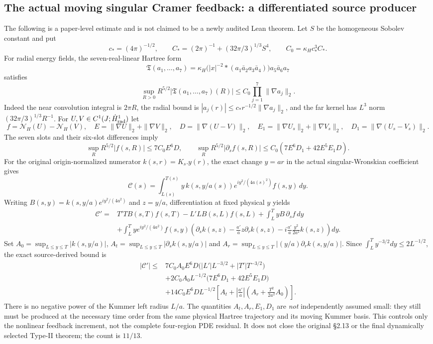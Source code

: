 \subsection*{The actual moving singular Cramer feedback: a differentiated source producer}
The following is a paper-level estimate and is not claimed to be a newly audited Lean theorem.
Let $S$ be the homogeneous Sobolev constant and put
\[
c_*=(4\pi)^{-1/2},\qquad
C_*=(2\pi)^{-1}+(32\pi/3)^{1/3}S^4,\qquad
C_0=\kappa_Hc_*^3C_*.
\]
For radial energy fields, the seven-real-linear Hartree form
\[
\mathfrak T(a_1,\ldots,a_7)=
\kappa_H\bigl(|x|^{-2}*(a_1\bar a_2a_3\bar a_4)\bigr)
a_5\bar a_6a_7
\]
satisfies
\[
\sup_{R>0}R^{5/2}|\mathfrak T(a_1,\ldots,a_7)(R)|
\le C_0\prod_{j=1}^7\|\nabla a_j\|_2.
\]
Indeed the near convolution integral is $2\pi R$, the radial bound is
$|a_j(r)|\le c_*r^{-1/2}\|\nabla a_j\|_2$, and the far kernel
has $L^3$ norm $(32\pi/3)^{1/3}R^{-1}$.
For $U,V\in C^1(J;\dot H^1_{\rm rad})$ let
\[
f=\mathcal N_H(U)-\mathcal N_H(V),\quad
E=\|\nabla U\|_2+\|\nabla V\|_2,\quad
D=\|\nabla(U-V)\|_2,\quad
E_1=\|\nabla U_s\|_2+\|\nabla V_s\|_2,\quad
D_1=\|\nabla(U_s-V_s)\|_2.
\]
The seven slots and their six-slot differences imply
\[
\sup_R R^{5/2}|f(s,R)|\le7C_0 E^6D,\qquad
\sup_R R^{5/2}|\partial_sf(s,R)|
\le C_0(7E^6D_1+42E^5E_1D).
\]
For the original origin-normalized numerator $k(s,r)=K_s.y(r)$,
the exact change $y=ar$ in the actual singular-Wronskian coefficient gives
\[
\mathcal C(s)=\int_{L(s)}^{T(s)}
y\,k(s,y/a(s))e^{iy^2/(4a(s)^2)}f(s,y)\,dy .
\]
Writing $B(s,y)=k(s,y/a)e^{iy^2/(4a^2)}$ and $z=y/a$,
differentiation at fixed physical $y$ yields
\[
\begin{aligned}
\mathcal C'={}&T'TB(s,T)f(s,T)-L'LB(s,L)f(s,L)
 +\int_L^T yB\,\partial_sf\,dy\\
&+\int_L^T ye^{iy^2/(4a^2)}f(s,y)
\left(\partial_sk(s,z)-\frac{a'}a z\partial_rk(s,z)
-i\frac{a'}a\frac{y^2}{2a^2}k(s,z)\right)dy .
\end{aligned}
\]
Set $A_0=\sup_{L\le y\le T}|k(s,y/a)|$,
$A_t=\sup_{L\le y\le T}|\partial_sk(s,y/a)|$ and
$A_r=\sup_{L\le y\le T}|(y/a)\partial_rk(s,y/a)|$.
Since $\int_L^T y^{-3/2}dy\le2L^{-1/2}$, the exact
source-derived bound is
\[
\begin{aligned}
|\mathcal C'|\le {}&
7C_0A_0E^6D\bigl(|L'|L^{-3/2}+|T'|T^{-3/2}\bigr)\\
&+2C_0A_0L^{-1/2}\bigl(7E^6D_1+42E^5E_1D\bigr)\\
&+14C_0E^6DL^{-1/2}
\left[A_t+\left|\frac{a'}a\right|
\left(A_r+\frac{T^2}{2a^2}A_0\right)\right].
\end{aligned}
\]
There is no negative power of the Kummer left radius $L/a$.
The quantities $A_t,A_r,E_1,D_1$ are \emph{not} independently assumed
small: they still must be produced at the necessary time order from
the same physical Hartree trajectory and its moving Kummer basis.
This controls only the nonlinear feedback increment, not the complete
four-region PDE residual. It does not close the original \S2.13 or
the final dynamically selected Type-II theorem; the count is $11/13$.
